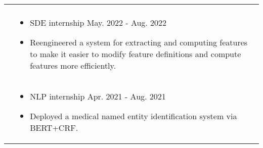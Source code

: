 \documentclass[letterpaper, 10pt]{article}
\begin{document}
\begin{longtable}{p{1.3in}p{4.8in}}



& \\


{\color{black}{Industry Experience}} 

&  \begin{itemize}[leftmargin=10pt, itemsep=-5pt, topsep=0pt,before=\textbf{Lime}]
    \item SDE internship \hfill May. 2022 - Aug. 2022 
    \item Reengineered a system for extracting and computing features to make it easier to modify feature definitions and compute features more efficiently.
  \end{itemize}\\ 

  

&  \begin{itemize}[leftmargin=10pt, itemsep=-5pt, topsep=0pt,before=\textbf{Umer Technology}]
    \item NLP internship \hfill Apr. 2021 - Aug. 2021 
    \item  Deployed a medical named entity identification system via BERT+CRF.
  \end{itemize}\\ 


\end{longtable}
\end{document}
